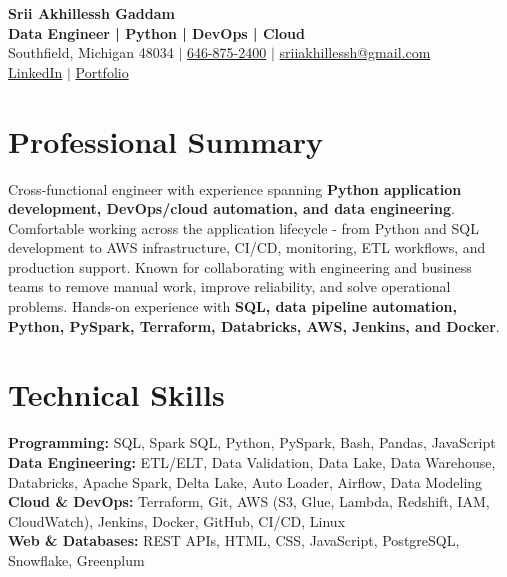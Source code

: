 \documentclass[letterpaper,10pt]{article}
\begin{document}
\fontsize{9.35pt}{10.45pt}\selectfont

\begin{center}
    {\LARGE \textbf{Srii Akhillessh Gaddam}} \\[-1pt]
    \textbf{Data Engineer | Python | DevOps | Cloud} \\[2pt]
    Southfield, Michigan 48034 $|$
    \href{tel:6468752400}{646-875-2400} $|$
    \href{mailto:sriiakhillessh@gmail.com}{sriiakhillessh@gmail.com} \\[1pt]
    \href{https://www.linkedin.com/in/srii-akhiilessh-gaddam-b48668191/}{LinkedIn} $|$
    \href{https://sriiakhillesshg.github.io/portfolio/}{Portfolio}
\end{center}
\vspace{-8pt}

\section{Professional Summary}
\small{Cross-functional engineer with experience spanning \textbf{Python application development, DevOps/cloud automation, and data engineering}. Comfortable working across the application lifecycle - from Python and SQL development to AWS infrastructure, CI/CD, monitoring, ETL workflows, and production support. Known for collaborating with engineering and business teams to remove manual work, improve reliability, and solve operational problems. Hands-on experience with \textbf{SQL, data pipeline automation, Python, PySpark, Terraform, Databricks, AWS, Jenkins, and Docker}.}

\section{Technical Skills}
\small{
\textbf{Programming:} SQL, Spark SQL, Python, PySpark, Bash, Pandas, JavaScript \\
\textbf{Data Engineering:} ETL/ELT, Data Validation, Data Lake, Data Warehouse, Databricks, Apache Spark, Delta Lake, Auto Loader, Airflow, Data Modeling \\
\textbf{Cloud \& DevOps:} Terraform, Git, AWS (S3, Glue, Lambda, Redshift, IAM, CloudWatch), Jenkins, Docker, GitHub, CI/CD, Linux \\
\textbf{Web \& Databases:} REST APIs, HTML, CSS, JavaScript, PostgreSQL, Snowflake, Greenplum
}
\end{document}
